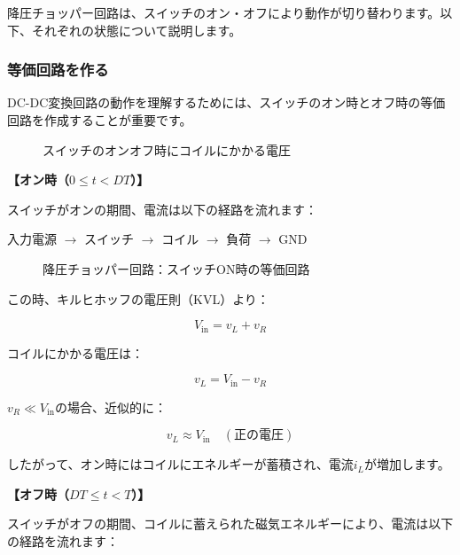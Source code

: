 降圧チョッパー回路は、スイッチのオン・オフにより動作が切り替わります。以下、それぞれの状態について説明します。

\subsubsection{等価回路を作る}

DC-DC変換回路の動作を理解するためには、スイッチのオン時とオフ時の等価回路を作成することが重要です。

\begin{figure}[H]
\centering
{}
\caption{スイッチのオンオフ時にコイルにかかる電圧}
\label{fig:ch05_switch_voltage}
\end{figure}

\textbf{【オン時（$0 \le t < DT$）】}

スイッチがオンの期間、電流は以下の経路を流れます：

\begin{center}
入力電源 $\rightarrow$ スイッチ $\rightarrow$ コイル $\rightarrow$ 負荷 $\rightarrow$ GND
\end{center}

\begin{figure}[H]
\centering
{}
\caption{降圧チョッパー回路：スイッチON時の等価回路}
\label{fig:ch05_buck_on}
\end{figure}

この時、キルヒホッフの電圧則（KVL）より：

\begin{equation}
V_{\text{in}} = v_L + v_R
\end{equation}

コイルにかかる電圧は：

\begin{equation}
v_L = V_{\text{in}} - v_R
\end{equation}

$v_R \ll V_{\text{in}}$の場合、近似的に：

\begin{equation}
v_L \approx V_{\text{in}} \quad (\text{正の電圧})
\end{equation}

したがって、オン時にはコイルにエネルギーが蓄積され、電流$i_L$が増加します。

\textbf{【オフ時（$DT \le t < T$）】}

スイッチがオフの期間、コイルに蓄えられた磁気エネルギーにより、電流は以下の経路を流れます：

